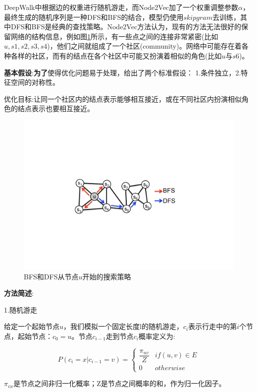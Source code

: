 DeepWalk中根据边的权重进行随机游走，而Node2Vec加了一个权重调整参数$\alpha$，最终生成的随机序列是一种DFS和BFS的结合，模型仍使用$skip gram$去训练，其中DFS和BFS是经典的查找策略。Node2Vec方法认为，现有的方法无法很好的保留网络的结构信息，例如图\ref{fig:node2vec1}所示，有一些点之间的连接非常紧密(比如$u, s1, s2, s3,s4$)，他们之间就组成了一个社区(community)。网络中可能存在着各种各样的社区，而有的结点在各个社区中可能又扮演着相似的角色(比如$u$与$s6$)。

\textbf{基本假设}:\textbf{为了}使得优化问题易于处理，给出了两个标准假设：
1.条件独立，2.特征空间的对称性。

优化目标:让同一个社区内的结点表示能够相互接近，或在不同社区内扮演相似角色的结点表示也要相互接近。

\begin{figure}[!htbp]
	\centering
	\includegraphics[scale=1]{Fig/Node2Vec_1.pdf}
	\caption{BFS和DFS从节点$u$开始的搜索策略\cite{grover2016node2vec}}
	\label{fig:node2vec1}
\end{figure}

\textbf{方法简述}:

1.随机游走

给定一个起始节点$u$，我们模拟一个固定长度l的随机游走，$c_i$表示行走中的第$i$个节点，起始节点：$c_0 = u$。节点$c_{i-1}$走到节点$c_i$概率定义为:

$$ P(c_i=x|c_{i-1}=v)=\left\{
\begin{aligned}
\dfrac{\pi_{uv}}{Z} & if (u,v)\in E\\
0 & otherwise
\end{aligned}
\right.
$$

$\pi_{vx}$是节点之间非归一化概率；Z是节点之间概率的和，作为归一化因子。

